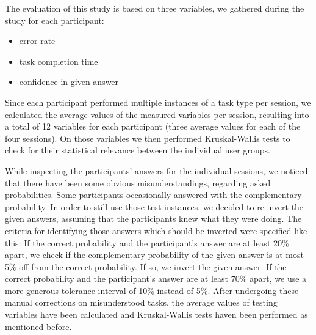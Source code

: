 The evaluation of this study is based on three variables, we gathered during the study for each participant:

\begin{itemize}
\item error rate
\item task completion time
\item confidence in given answer
\end{itemize}

Since each participant performed multiple instances of a task type per session, we calculated the average values of the measured variables per session, resulting into a total of 12 variables for each participant (three average values for each of the four sessions). On those variables we then performed Kruskal-Wallis tests to check for their statistical relevance between the individual user groups. \par \medskip

While inspecting the participants' answers for the individual sessions, we noticed that there have been some obvious misunderstandings, regarding asked probabilities. Some participants occasionally answered with the complementary probability. In order to still use those test instances, we decided to re-invert the given answers, assuming that the participants knew what they were doing. The criteria for identifying those answers which should be inverted were specified like this: If the correct probability and the participant's answer are at least 20\% apart, we check if the complementary probability of the given answer is at most 5\% off from the correct probability. If so, we invert the given answer. If the correct probability and the participant's answer are at least 70\% apart, we use a more generous tolerance interval of 10\% instead of 5\%. After undergoing these manual corrections on misunderstood tasks, the average values of testing variables have been calculated and Kruskal-Wallis tests haven been performed as mentioned before.